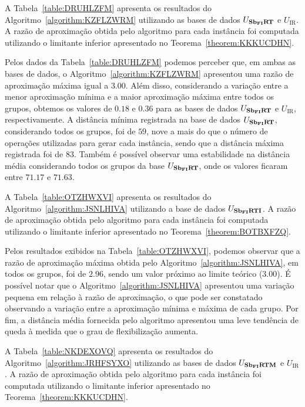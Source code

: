 A Tabela~\ref{table:DRUHLZFM} apresenta os resultados do Algoritmo~\ref{algorithm:KZFLZWRM} utilizando as bases de dados $U_{\textbf{Sb\textsubscript{FI}RT}}{}$ e $U_{\text{IR}}$. A razão de aproximação obtida pelo algoritmo para cada instância foi computada utilizando o limitante inferior apresentado no Teorema~\ref{theorem:KKKUCDHN}.



Pelos dados da Tabela~\ref{table:DRUHLZFM} podemos perceber que, em ambas as bases de dados, o Algoritmo~\ref{algorithm:KZFLZWRM} apresentou uma razão de aproximação máxima igual a $3.00$. Além disso, considerando a variação entre a menor aproximação mínima e a maior aproximação máxima entre todos os grupos, obtemos os valores de $0.18$ e $0.36$ para as bases de dados $U_{\textbf{Sb\textsubscript{FI}RT}}{}$ e $U_{\text{IR}}$, respectivamente. A distância mínima registrada na base de dados $U_{\textbf{Sb\textsubscript{FI}RT}}{}$, considerando todos os grupos, foi de $59$, nove a mais do que o número de operações utilizadas para gerar cada instância, sendo que a distância máxima registrada foi de $83$. Também é possível observar uma estabilidade na distância média considerando todos os grupos da base $U_{\textbf{Sb\textsubscript{FI}RT}}{}$, onde os valores ficaram entre $71.17$ e $71.63$.

A Tabela~\ref{table:OTZHWXVI} apresenta os resultados do Algoritmo~\ref{algorithm:JSNLHIVA} utilizando a base de dados $U_{\textbf{Sb\textsubscript{FI}RTI}}{}$. A razão de aproximação obtida pelo algoritmo para cada instância foi computada utilizando o limitante inferior apresentado no Teorema~\ref{theorem:BOTBXFZQ}.



Pelos resultados exibidos na Tabela~\ref{table:OTZHWXVI}, podemos observar que a razão de aproximação máxima obtida pelo Algoritmo~\ref{algorithm:JSNLHIVA}, em todos os grupos, foi de $2.96$, sendo um valor próximo ao limite teórico ($3.00$). É possível notar que o Algoritmo~\ref{algorithm:JSNLHIVA} apresentou uma variação pequena em relação à razão de aproximação, o que pode ser constatado observando a variação entre a aproximação mínima e máxima de cada grupo. Por fim, a distância média fornecida pelo algoritmo apresentou uma leve tendência de queda à medida que o grau de flexibilização aumenta.

A Tabela~\ref{table:NKDEXOVQ} apresenta os resultados do Algoritmo~\ref{algorithm:JRHFSYXO} utilizando as bases de dados $U_{\textbf{Sb\textsubscript{FI}RTM}}{}$ e $U_{\text{IR}}$. A razão de aproximação obtida pelo algoritmo para cada instância foi computada utilizando o limitante inferior apresentado no Teorema~\ref{theorem:KKKUCDHN}.

